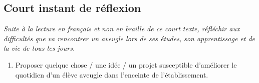 \documentclass[10pt]{article}
\begin{document}
\subsection{Court instant de réflexion}
\textit{Suite à la lecture en français et non en braille de ce court texte, réfléchir aux difficultés que va rencontrer un aveugle lors de ses études, son apprentissage et de la vie de tous les jours.}
\begin{enumerate}
\item Proposer quelque chose / une idée / un projet susceptible d'améliorer le quotidien d'un élève aveugle dans l'enceinte de l'établissement.
\end{enumerate}
\end{document}

